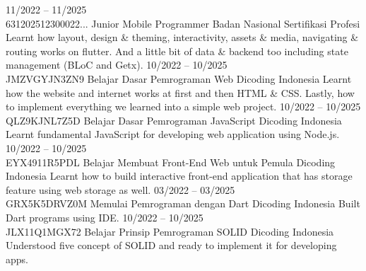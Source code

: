 \documentclass[9pt]{developercv} %
\begin{document}
\vspace{-10 pt}
\begin{entrylist}
	\entry
	{11/2022 -- 11/2025
		\\\footnotesize{631202512300022...}}
	{Junior Mobile Programmer}
	{Badan Nasional Sertifikasi Profesi}
	{Learnt how layout, design \& theming, interactivity, assets \& media, navigating \& routing works on flutter. And a little bit of data \& backend too including state management (BLoC and Getx).}
	\entry
	{10/2022 -- 10/2025
		\\\footnotesize{JMZVGYJN3ZN9}}
	{Belajar Dasar Pemrograman Web}
	{Dicoding Indonesia}
	{Learnt how the website and internet works at first and then HTML \& CSS. Lastly, how to implement everything we learned into a simple web project.}
	\entry
	{10/2022 -- 10/2025
		\\\footnotesize{QLZ9KJNL7Z5D}}
	{Belajar Dasar Pemrograman JavaScript}
	{Dicoding Indonesia}
	{Learnt fundamental JavaScript for developing web application using Node.js.}
	\entry
	{10/2022 -- 10/2025
		\\\footnotesize{EYX4911R5PDL}}
	{Belajar Membuat Front-End Web untuk Pemula}
	{Dicoding Indonesia}
	{Learnt how to build interactive front-end application that has storage feature using web storage as well.}
	\entry
	{03/2022 -- 03/2025
		\\\footnotesize{GRX5K5DRVZ0M}}
	{Memulai Pemrograman dengan Dart}
	{Dicoding Indonesia}
	{Built Dart programs using IDE.}
	\entry
	{10/2022 -- 10/2025
		\\\footnotesize{JLX11Q1MGX72}}
	{Belajar Prinsip Pemrograman SOLID}
	{Dicoding Indonesia}
	{Understood five concept of SOLID and ready to implement it for developing apps.}
\end{entrylist}
\end{document}
